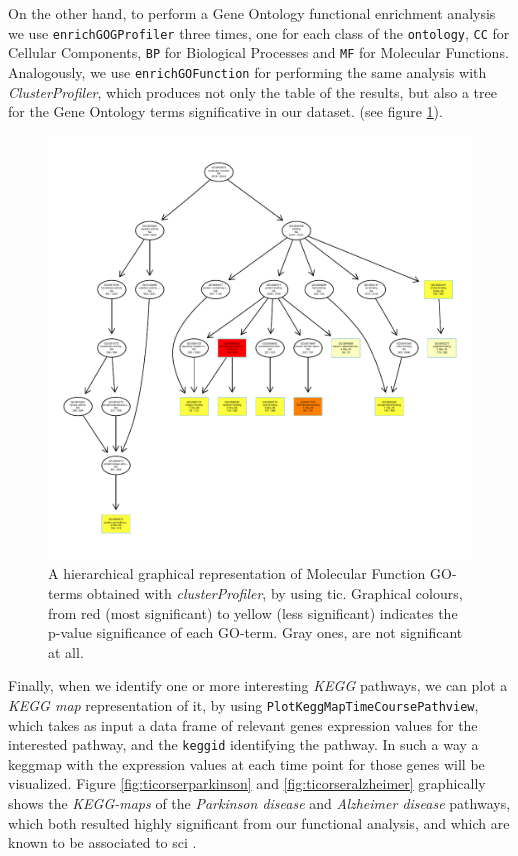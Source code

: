 On the other hand, to perform a Gene Ontology functional enrichment analysis we use \lstinline!enrichGOGProfiler! three times, one for each class of the \lstinline!ontology!, \lstinline!CC! for Cellular Components, \lstinline!BP! for Biological Processes and \lstinline!MF! for Molecular Functions.
Analogously, we use \lstinline!enrichGOFunction! for performing the same analysis with \textit{ClusterProfiler}, which produces not only the table of the results, but also a tree for the Gene Ontology terms significative in our dataset. (see figure \ref{fig:ticorsergo}).

\begin{figure}[H]
\centering
\includegraphics[width=\textwidth, keepaspectratio]{img/ticorser/functional/mf_hier.pdf}
\caption[ticorser hierarchial GO-terms]{A hierarchical graphical representation of Molecular Function GO-terms obtained with \textit{clusterProfiler}, by using \gls{tic}.
Graphical colours, from red (most significant) to yellow (less significant) indicates the p-value significance of each GO-term. 
Gray ones, are not significant at all.}
\label{fig:ticorsergo}
\end{figure}

Finally, when we identify one or more interesting \textit{KEGG} pathways, we can plot a \textit{KEGG map} representation of it, by using \lstinline!PlotKeggMapTimeCoursePathview!, which takes as input a data frame of relevant genes expression values for the interested pathway, and the \lstinline!keggid! identifying the pathway. 
In such a way a keggmap with the expression values at each time point for those genes will be visualized.
Figure \ref{fig:ticorserparkinson} and \ref{fig:ticorseralzheimer} graphically shows the \textit{KEGG-maps} of the \textit{Parkinson disease} and \textit{Alzheimer disease} pathways, which both resulted highly significant from our functional analysis, and which are known to be associated to \gls{sci} \cite{Yeh2016, Yeh2018}.

